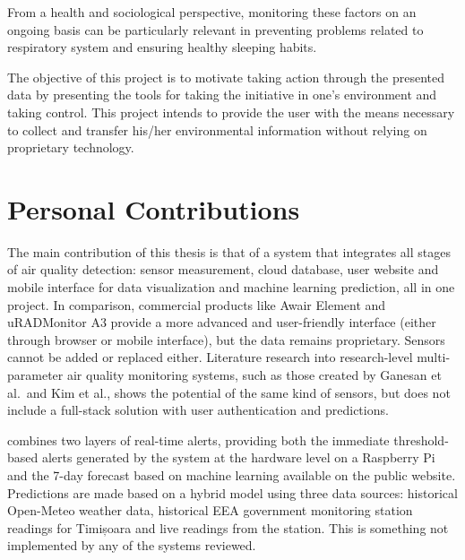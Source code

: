 From a health and sociological perspective, monitoring these factors on an ongoing basis can be
particularly relevant in preventing problems related to respiratory system and ensuring healthy
sleeping habits.

The objective of this project is to motivate taking action through the presented data by
presenting the tools for taking the initiative in one's environment and taking control. This
project intends to provide the user with the means necessary to collect and transfer his/her
environmental information without relying on proprietary technology.

\section{Personal Contributions}
\label{sec:contributions}

The main contribution of this thesis is that of a system that integrates all stages of air
quality detection: sensor measurement, cloud database, user website and mobile interface for
data visualization and machine learning prediction, all in one project. In comparison,
commercial products like Awair Element and uRADMonitor A3 provide a more advanced and
user-friendly interface (either through browser or mobile interface), but the data remains
proprietary. Sensors cannot be added or replaced either. Literature research into
research-level multi-parameter air quality monitoring systems, such as those created by
Ganesan et al.\ and Kim et al., shows the potential of the same kind of sensors, but does not
include a full-stack solution with user authentication and predictions.

\airnest{} combines two layers of real-time alerts, providing both the immediate
threshold-based alerts generated by the system at the hardware level on a Raspberry Pi and the
7-day forecast based on machine learning available on the public website. Predictions are made
based on a hybrid model using three data sources: historical Open-Meteo weather data, historical
EEA government monitoring station readings for Timișoara and live readings from the station.
This is something not implemented by any of the systems reviewed.
